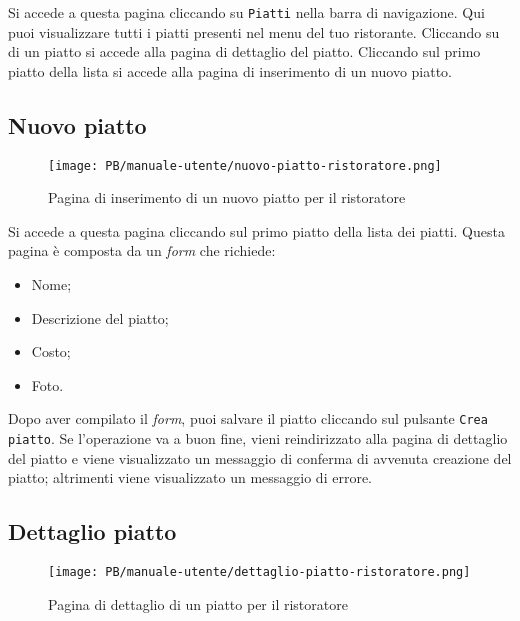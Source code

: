 Si accede a questa pagina cliccando su \texttt{Piatti} nella barra di
navigazione. Qui puoi visualizzare tutti i piatti presenti nel menu del tuo
ristorante. Cliccando su di un piatto si accede alla pagina di dettaglio del
piatto. Cliccando sul primo piatto della lista si accede alla pagina di
inserimento di un nuovo piatto.

\newpage
\subsection{Nuovo piatto}

\begin{figure}[htbp]
    \centering
	\texttt{[image: PB/manuale-utente/nuovo-piatto-ristoratore.png]}
    \caption{Pagina di inserimento di un nuovo piatto per il ristoratore}
\end{figure}

Si accede a questa pagina cliccando sul primo piatto della lista dei piatti.
Questa pagina è composta da un \textit{form} che richiede:
\begin{itemize}
	\item Nome;
	\item Descrizione del piatto;
	\item Costo;
	\item Foto.
\end{itemize}

Dopo aver compilato il \textit{form}, puoi salvare il piatto cliccando sul pulsante
\texttt{Crea piatto}. Se l'operazione va a buon fine, vieni reindirizzato alla
pagina di dettaglio del piatto e viene visualizzato un messaggio di conferma di
avvenuta creazione del piatto; altrimenti viene visualizzato un messaggio di
errore.

\subsection{Dettaglio piatto}

\begin{figure}[htbp]
    \centering
	\texttt{[image: PB/manuale-utente/dettaglio-piatto-ristoratore.png]}
    \caption{Pagina di dettaglio di un piatto per il ristoratore}
\end{figure}

